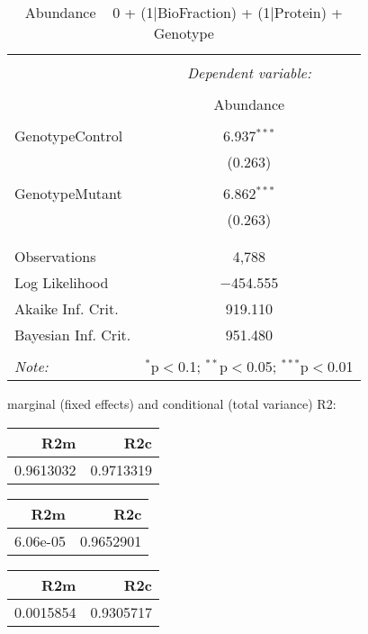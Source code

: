 \documentclass[11pt]{report}
\begin{document}
\begin{table}[!htbp] \centering 
  \caption{Abundance ~ 0 + (1|BioFraction) + (1|Protein) + Genotype} 
  \label{} 
\begin{tabular}{@{\extracolsep{5pt}}lc} 
\\[-1.8ex]\hline 
\hline \\[-1.8ex] 
 & \multicolumn{1}{c}{\textit{Dependent variable:}} \\ 
\cline{2-2} 
\\[-1.8ex] & Abundance \\ 
\hline \\[-1.8ex] 
 GenotypeControl & 6.937$^{***}$ \\ 
  & (0.263) \\ 
  & \\ 
 GenotypeMutant & 6.862$^{***}$ \\ 
  & (0.263) \\ 
  & \\ 
\hline \\[-1.8ex] 
Observations & 4,788 \\ 
Log Likelihood & $-$454.555 \\ 
Akaike Inf. Crit. & 919.110 \\ 
Bayesian Inf. Crit. & 951.480 \\ 
\hline 
\hline \\[-1.8ex] 
\textit{Note:}  & \multicolumn{1}{r}{$^{*}$p$<$0.1; $^{**}$p$<$0.05; $^{***}$p$<$0.01} \\ 
\end{tabular} 
\end{table} 
marginal (fixed effects) and conditional (total variance) R2:

\begin{tabular}{r|r}
\hline
R2m & R2c\\
\hline
0.9613032 & 0.9713319\\
\hline
\end{tabular}

\begin{tabular}{r|r}
\hline
R2m & R2c\\
\hline
6.06e-05 & 0.9652901\\
\hline
\end{tabular}

\begin{tabular}{r|r}
\hline
R2m & R2c\\
\hline
0.0015854 & 0.9305717\\
\hline
\end{tabular}
\end{document}
